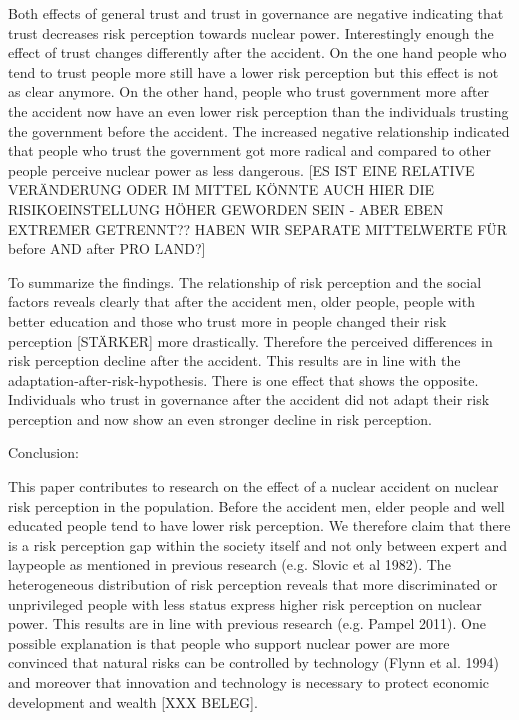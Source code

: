 {%
Both effects of general trust and trust in governance are negative indicating that trust decreases risk perception towards nuclear power. Interestingly enough the effect of trust changes differently after the accident. On the one hand people who tend to trust people more still have a lower risk perception but this effect is not as clear anymore. On the other hand, people who trust government more after the accident now have an even lower risk perception than the individuals trusting the government before the accident. The increased negative relationship indicated that people who trust the government got more radical and compared to other people perceive nuclear power as less dangerous. [ES IST EINE RELATIVE VERÄNDERUNG ODER IM MITTEL KÖNNTE AUCH HIER DIE RISIKOEINSTELLUNG HÖHER GEWORDEN SEIN - ABER EBEN EXTREMER GETRENNT?? HABEN WIR SEPARATE MITTELWERTE FÜR before AND after PRO LAND?]



To summarize the findings. The relationship of risk perception and the social factors reveals clearly that after the accident men, older people,  people with better education and those who trust more in people changed their risk perception [STÄRKER] more drastically. Therefore the perceived differences in risk perception decline after the accident. This results are in line with the adaptation-after-risk-hypothesis. There is one effect that shows the opposite. Individuals who trust in governance after the accident did not adapt their risk perception and now show an even stronger decline in risk perception. 







 Conclusion:  

This paper contributes to research on the effect of a nuclear accident on nuclear risk perception  in the population. Before the accident men, elder people and well educated people tend to have lower risk perception. We therefore claim that there is a risk perception gap within the society itself and not only   between expert and laypeople as mentioned in previous research (e.g. Slovic et al 1982). The heterogeneous distribution of risk perception reveals that  more discriminated or unprivileged people with less status express higher risk perception on nuclear power. This results are in line with previous research (e.g. Pampel 2011). 
One possible explanation is that people who support nuclear power are more convinced that natural risks can be controlled by technology (Flynn et al. 1994) and moreover that innovation and technology is necessary to protect economic development and wealth [XXX BELEG].   




}
